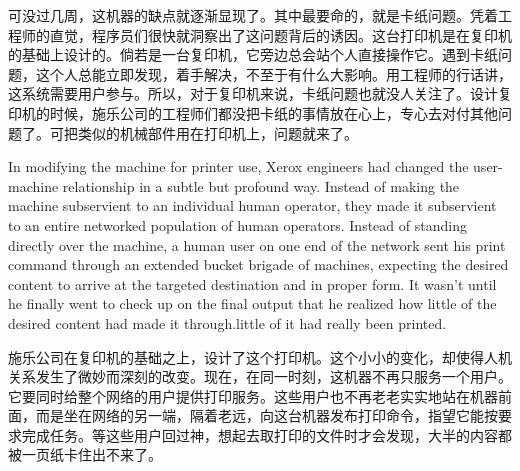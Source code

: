 \ifdefined\chs
可没过几周，这机器的缺点就逐渐显现了。其中最要命的，就是卡纸问题。凭着工程师的直觉，程序员们很快就洞察出了这问题背后的诱因。这台打印机是在复印机的基础上设计的。倘若是一台复印机，它旁边总会站个人直接操作它。遇到卡纸问题，这个人总能立即发现，着手解决，不至于有什么大影响。用工程师的行话讲，这系统需要用户参与。所以，对于复印机来说，卡纸问题也就没人关注了。设计复印机的时候，施乐公司的工程师们都没把卡纸的事情放在心上，专心去对付其他问题了。可把类似的机械部件用在打印机上，问题就来了。
\fi

\ifdefined\eng
In modifying the machine for printer use, Xerox engineers had changed the user-machine relationship in a subtle but profound way. Instead of making the machine subservient to an individual human operator, they made it subservient to an entire networked population of human operators. Instead of standing directly over the machine, a human user on one end of the network sent his print command through an extended bucket brigade of machines, expecting the desired content to arrive at the targeted destination and in proper form. It wasn't until he finally went to check up on the final output that he realized how \ifdefined\vone little of the desired content had made it through.\fi\ifdefined\vtwo little of it had really been printed.\fi
\fi

\ifdefined\chs
施乐公司在复印机的基础之上，设计了这个打印机。这个小小的变化，却使得人机关系发生了微妙而深刻的改变。现在，在同一时刻，这机器不再只服务一个用户。它要同时给整个网络的用户提供打印服务。这些用户也不再老老实实地站在机器前面，而是坐在网络的另一端，隔着老远，向这台机器发布打印命令，指望它能按要求完成任务。等这些用户回过神，想起去取打印的文件时才会发现，大半的内容都被一页纸卡住出不来了。
\fi

